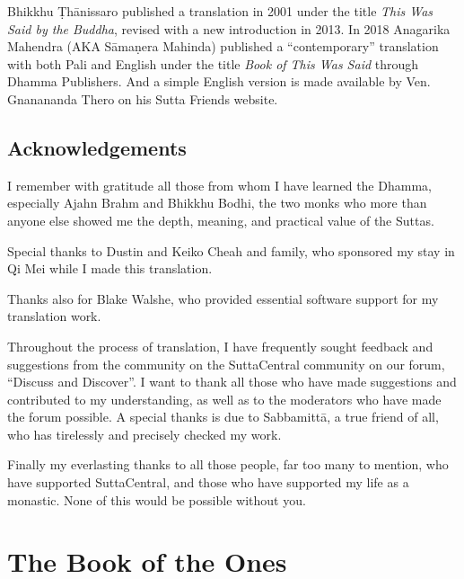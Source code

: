 \documentclass[12pt,openany]{book}%
\let\oldcontentsline\contentsline
\newcommand{\nopagecontentsline}[3]{\oldcontentsline{#1}{#2}{}}
\let\oldmainmatter\mainmatter
\renewcommand{\mainmatter}{%
\chapterfont{\setstretch{.85}\normalfont\centering}%
\sectionfont{\setstretch{.85}\normalfont\centering}%
\oldmainmatter}
\begin{document}
Bhikkhu \textsanskrit{Ṭhānissaro} published a translation in 2001 under the title \textit{This Was Said by the Buddha}, revised with a new introduction in 2013. In 2018 Anagarika Mahendra (AKA \textsanskrit{Sāmaṇera} Mahinda) published a “contemporary” translation with both Pali and English under the title \textit{Book of This Was Said} through Dhamma Publishers. And a simple English version is made available by Ven. Gnanananda Thero on his Sutta Friends website.

%
\chapter*{Acknowledgements}

I remember with gratitude all those from whom I have learned the Dhamma, especially Ajahn Brahm and Bhikkhu Bodhi, the two monks who more than anyone else showed me the depth, meaning, and practical value of the Suttas.

Special thanks to Dustin and Keiko Cheah and family, who sponsored my stay in Qi Mei while I made this translation.

Thanks also for Blake Walshe, who provided essential software support for my translation work.

Throughout the process of translation, I have frequently sought feedback and suggestions from the community on the SuttaCentral community on our forum, “Discuss and Discover”. I want to thank all those who have made suggestions and contributed to my understanding, as well as to the moderators who have made the forum possible. A special thanks is due to \textsanskrit{Sabbamittā}, a true friend of all, who has tirelessly and precisely checked my work.

Finally my everlasting thanks to all those people, far too many to mention, who have supported SuttaCentral, and those who have supported my life as a monastic. None of this would be possible without you.

%
\mainmatter%
\pagestyle{fancy}%
\part*{The Book of the Ones }
\markboth{}{}
\addtocontents{toc}{\let\protect\contentsline\protect\oldcontentsline}
\end{document}
